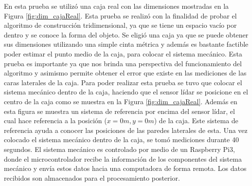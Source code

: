 En esta prueba se utilizó una caja real con las dimensiones mostradas en 
la Figura \ref{fig:dim_cajaReal}. Esta prueba se realizó con la finalidad 
de probar el algoritmo de construcción tridimensional, ya que se tiene un 
espacio vacío por dentro y se conoce la forma del objeto. Se eligió una 
caja ya que se puede obtener sus dimensiones utilizando una simple cinta 
métrica y además es bastante factible poder estimar el punto medio de 
la caja, para colocar el sistema mecánico. Esta prueba es importante ya 
que nos brinda una perspectiva del funcionamiento del algoritmo y 
asimismo permite obtener el error que existe en las mediciones de las 
caras laterales de la caja. Para poder realizar esta prueba se tuvo que
colocar el sistema mecánico dentro de la caja, haciendo que el sensor lídar 
se posicione en el centro de la caja como se muestra en la Figura 
\ref{fig:dim_cajaReal}. Además en esta figura se muestra un sistema de 
referencia por encima del sensor lídar, el cual hace referencia a la 
posición ($x = 0 m, y = 0 m$) de la caja. Este sistema de referencia ayuda 
a conocer las posiciones de las paredes laterales de esta. Una vez 
colocado el sistema mecánico dentro de la caja, se tomó mediciones 
durante 40 segundos. El sistema mecánico es controlado por medio de un 
Raspberry Pi3, donde el microcontrolador recibe la información de los 
componentes del sistema mecánico y envía estos datos hacia una computadora
de forma remota. Los datos recibidos son almacenados para el procesamiento 
posterior.



